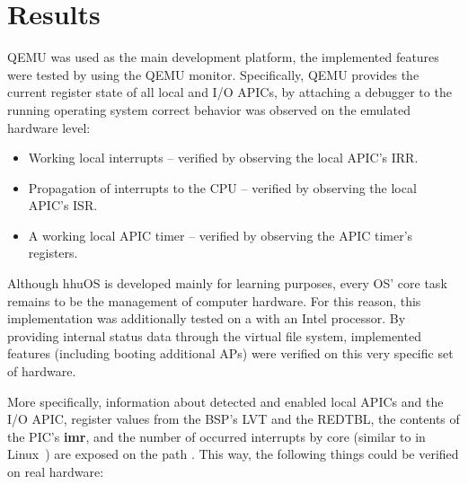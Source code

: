 \section{Results}
\label{sec:verificationresults}

QEMU was used as the main development platform, the implemented features were tested by using the QEMU monitor.
Specifically, QEMU provides the current register state of all local and I/O APICs, by attaching a debugger to the running operating system correct behavior was observed on the emulated hardware level:

\begin{itemize}
  \item Working local interrupts -- verified by observing the local APIC's IRR\@.
  \item Propagation of interrupts to the CPU -- verified by observing the local APIC's ISR\@.
  \item A working local APIC timer -- verified by observing the APIC timer's registers.
\end{itemize}

Although hhuOS is developed mainly for learning purposes, every OS' core task remains to be the management of computer hardware.
For this reason, this implementation was additionally tested on a  with an Intel  processor.
By providing internal status data through the virtual file system, implemented features (including booting additional APs) were verified on this very specific set of hardware.

More specifically, information about detected and enabled local APICs and the I/O APIC, register values from the BSP's LVT and the REDTBL, the contents of the PIC's \textbf{\gls{imr}}, and the number of occurred interrupts by core (similar to  in Linux~\autocite{linux}) are exposed on the path .
This way, the following things could be verified on real hardware:

